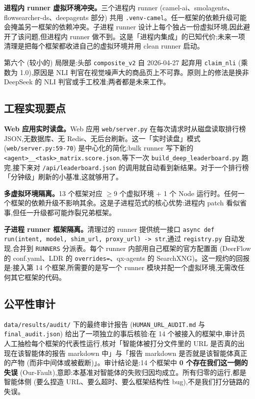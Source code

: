\documentclass[UTF8,a4paper,12pt,oneside]{ctexart}
\begin{document}
\textbf{进程内 runner 虚拟环境冲突。}三个进程内 runner (camel-ai、smolagents、flowsearcher-ds、deepagents 部分) 共用 \texttt{.venv-camel}。任一框架的依赖升级可能会掩盖另一框架的依赖冲突。子进程 runner 设计上每个独占一份虚拟环境,因此避开了该问题,但进程内 runner 做不到。这是「进程内集成」的已知代价;未来一项清理是把每个框架都收进自己的虚拟环境并用 clean runner 启动。

第六个 (较小的) 局限是:头部 \texttt{composite\_v2} 自 2026-04-27 起弃用 \texttt{claim\_nli} (乘数为 1.0),原因是 NLI 判官在视觉噪声大的商品页上不可靠。原则上的修法是换非 DeepSeek 的 NLI 判官或手工校准;两者都是未来工作。

\subsection{工程实现要点}

\textbf{Web 应用实时读盘。}Web 应用 \texttt{web/server.py} 在每次请求时从磁盘读取排行榜 JSON,无数据库、无 Redis、无后台刷新。这一「实时读盘」模式 (\texttt{web/server.py:59-70}) 是中心化的简化:bulk runner 写下新的 \texttt{<agent>\_\_<task>\_matrix.score.json},等下一次 \texttt{build\_deep\_leaderboard.py} 跑完,接下来对 \texttt{/api/leaderboard.json} 的调用就自动看到新结果。对于一个排行榜「分钟级」刷新的小基准,这就够用了。

\textbf{多虚拟环境隔离。}13 个框架对应 \(\geq 9\) 个虚拟环境 + 1 个 Node 运行时。任何一个框架的依赖升级不影响其余。这是子进程范式的核心优势:进程内 patch 看似省事,但任一升级都可能炸裂兄弟框架。

\textbf{子进程 runner 框架隔离。}清理过的 runner 提供统一接口 \texttt{async def run(intent, model, shim\_url, proxy\_url) -> str},通过 \texttt{registry.py} 自动发现,合并到 \texttt{RUNNERS} 分派表。每个 runner 内部用自己框架的官方配置面 (DeerFlow 的 conf.yaml、LDR 的 \texttt{overrides=}、qx-agents 的 SearchXNG)。这一规约的回报是:接入第 14 个框架,所需要的是写一个 runner 模块并配一个虚拟环境,无需改任何其它框架的代码。

\subsection{公平性审计}

\texttt{data/results/audit/} 下的最终审计报告 (\texttt{HUMAN\_URL\_AUDIT.md} 与 \texttt{final\_audit.json}) 给出了一项独立的事后核验:在 14 个被接入的框架中,审计员人工抽检每个框架的代表性运行,核对「智能体被打分文件里的 URL 是否真的出现在该智能体的报告 markdown 中」与「报告 markdown 是否就是该智能体真正的产物 (而非中间体或被截断)」。审计结论是:14 个框架中 \textbf{0 个存在我们这一侧的失误} (Our-Fault),意即:本基准对智能体的失败归因均成立。所有归零的运行,都是智能体侧 (要么捏造 URL、要么超时、要么框架结构性 bug),不是我们打分链路的失误。
\end{document}
